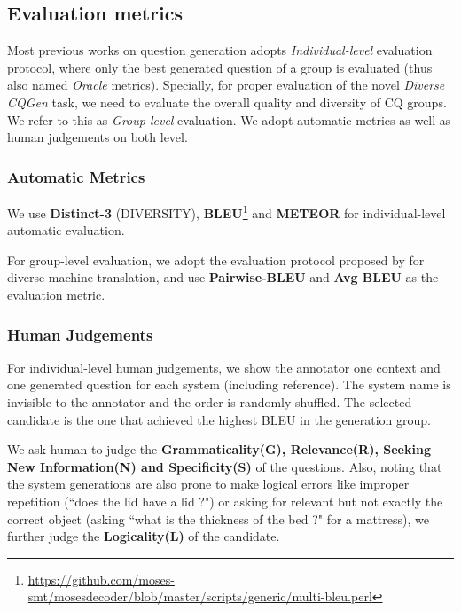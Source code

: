 \documentclass[letterpaper]{article} %
\begin{document}
\subsection{Evaluation metrics}
Most previous works on question generation \citep{jain2017creativity, hu2018aspect, rao2019answer} adopts \textit{Individual-level} evaluation protocol, where only the best generated question of a group is evaluated (thus also named \textit{Oracle} metrics). Specially, for proper evaluation of the novel \textit{Diverse CQGen} task, we need to evaluate the overall quality and diversity of CQ groups. We refer to this as \textit{Group-level} evaluation. We adopt automatic metrics as well as human judgements on both level. 

\subsubsection{Automatic Metrics}
We use \textbf{Distinct-3} (DIVERSITY), \textbf{BLEU}\footnote{\url{https://github.com/moses-smt/mosesdecoder/blob/master/scripts/generic/multi-bleu.perl}}\citep{papineni2002bleu} and 
\textbf{METEOR} \citep{banerjee2005meteor} for individual-level automatic evaluation.

For group-level evaluation, we adopt the evaluation protocol proposed by \citet{shen2019mixture} for diverse machine translation, and use \textbf{Pairwise-BLEU} and \textbf{Avg BLEU} as the evaluation metric.
\subsubsection{Human Judgements}
For individual-level human judgements, we show the annotator one context and one generated question for each system (including reference). The system name is invisible to the annotator and the order is randomly shuffled. The selected candidate is the one that achieved the highest BLEU in the generation group. 

We ask human to judge the \textbf{Grammaticality(G), Relevance(R), Seeking New Information(N) and Specificity(S)} of the questions. Also, noting that the system generations are also prone to make logical errors like improper repetition (``does the lid have a lid ?") or asking for relevant but not exactly the correct object (asking ``what is the thickness of the bed ?" for a mattress), we further judge the \textbf{Logicality(L)} of the candidate.
\end{document}
